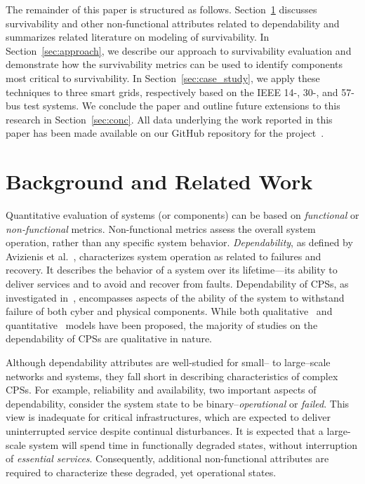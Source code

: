 \documentclass[review]{elsarticle}
\begin{document}
The remainder of this paper is structured as follows. Section~\ref{sec:rel_work} discusses survivability and other non-functional attributes related to dependability and summarizes related literature on modeling of survivability. In Section~\ref{sec:approach}, we describe our approach to survivability evaluation and demonstrate how the survivability metrics can be used to identify components most critical to survivability. In Section~\ref{sec:case_study}, we apply these techniques to three smart grids, respectively based on the IEEE 14-, 30-, and 57-bus test systems. We conclude the paper and outline future extensions to this research in Section~\ref{sec:conc}. All data underlying the work reported in this paper has been made available on our GitHub repository for the project~\cite{dataset}.

\section{Background and Related Work}
\label{sec:rel_work}
Quantitative evaluation of systems (or components) can be based on \emph{functional} or \emph{non-functional} metrics. Non-functional metrics assess the overall system operation, rather than any specific system behavior. \emph{Dependability}, as defined by Avizienis et al.~\cite{AvL04}, characterizes system operation as related to failures and recovery. It describes the behavior of a system over its lifetime---its ability to deliver services and to avoid and recover from faults. Dependability of CPSs, as investigated in~\cite{Er10,HaL10}, encompasses aspects of the ability of the system to withstand failure of both cyber and physical components. While both qualitative~\cite{MoK10,Ri04} and quantitative~\cite{VeS12,FaS09b} models have been proposed, the majority of studies on the dependability of CPSs are qualitative in nature.

Although dependability attributes are well-studied for small-- to large--scale networks and systems, they fall short in describing characteristics of complex CPSs. For example, reliability and availability, two important aspects of dependability, consider the system state to be binary--\emph{operational} or \emph{failed}. This view is inadequate for critical infrastructures, which are expected to deliver uninterrupted service despite continual disturbances. It is expected that a large-scale system will spend time in functionally degraded states, without interruption of \emph{essential services}. Consequently, additional non-functional attributes are required to characterize these degraded, yet operational states.
\end{document}
